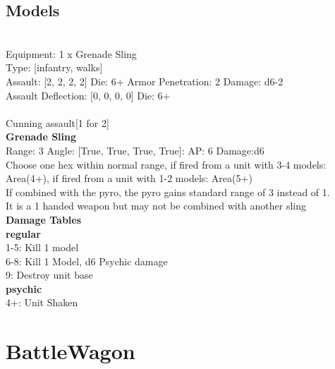 \subsection{ Models }

 \\
Equipment: 1 x Grenade Sling \\
Type: [infantry, walks] \\

Assault: [2, 2, 2, 2] Die: 6+ Armor Penetration: 2 Damage: d6-2 \\
Assault Deflection: [0, 0, 0, 0] Die: 6+\\
\\ 
Cunning assault[1 for 2]\\ 
 



{\bf Grenade Sling } \\



Range: 3  Angle: [True, True, True, True]: AP: 6 Damage:d6 \\
Choose one hex within normal range, if fired from a unit with 3-4 models: Area(4+), if fired from a unit with 1-2 models: Area(5+)\\ 
If combined with the pyro, the pyro gains standard range of 3 instead of 1.\\ 
It is a 1 handed weapon but may not be combined with another sling\\ 




 





{\bf Damage Tables} \\
 {\bf regular } \\
1-5: Kill 1 model \\
6-8: Kill 1 Model, d6 Psychic damage \\
9: Destroy unit base \\
 {\bf psychic } \\
4+: Unit Shaken \\










\pagebreak\pagebreak

\section{ BattleWagon }

